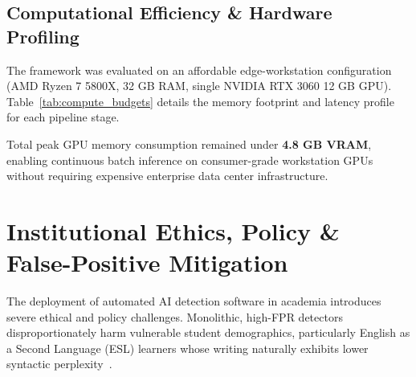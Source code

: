 \documentclass[journal]{IEEEtran}
\begin{document}
\subsection{Computational Efficiency \& Hardware Profiling}
The framework was evaluated on an affordable edge-workstation configuration (AMD Ryzen 7 5800X, 32 GB RAM, single NVIDIA RTX 3060 12 GB GPU). Table~\ref{tab:compute_budgets} details the memory footprint and latency profile for each pipeline stage.

\begin{table}[!t]
\caption{Compute Budget \& Inference Latency Profiling}
\label{tab:compute_budgets}
\centering
{}
\end{table}

Total peak GPU memory consumption remained under \textbf{4.8 GB VRAM}, enabling continuous batch inference on consumer-grade workstation GPUs without requiring expensive enterprise data center infrastructure.

\section{Institutional Ethics, Policy \& False-Positive Mitigation}
The deployment of automated AI detection software in academia introduces severe ethical and policy challenges. Monolithic, high-FPR detectors disproportionately harm vulnerable student demographics, particularly English as a Second Language (ESL) learners whose writing naturally exhibits lower syntactic perplexity~\cite{liang2023gpt}.
\end{document}
